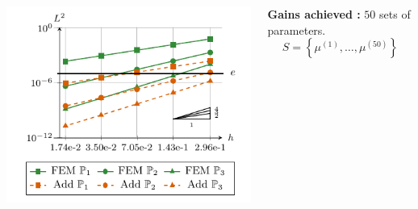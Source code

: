 \begin{columns}
{\begin{minipage}{0.49\linewidth}
\begin{tcolorbox}
                \vspace{-10pt}
                \hspace{-50pt}\includegraphics[width=1.18\linewidth]{images/numeric/poisson/dirichlet/cvg/cvg.pdf}
            \end{tcolorbox}
        \end{minipage} \;
        \begin{minipage}{0.49\linewidth}
            \centering
            \begin{tcolorbox}[
                colback=color1!50, %
                colframe=color2, %
                arc=2mm, %
                boxrule=2pt, %
                breakable, enhanced jigsaw,
                width=\linewidth
                ]            
                \textbf{Gains achieved :} $50$ sets of parameters.
                $$S=\left\{\mu^{(1)},\dots,\mu^{(50)}\right\}$$
                
                \vspace{5pt}
                \centering


\end{tcolorbox}
\end{minipage}}
\end{columns}

